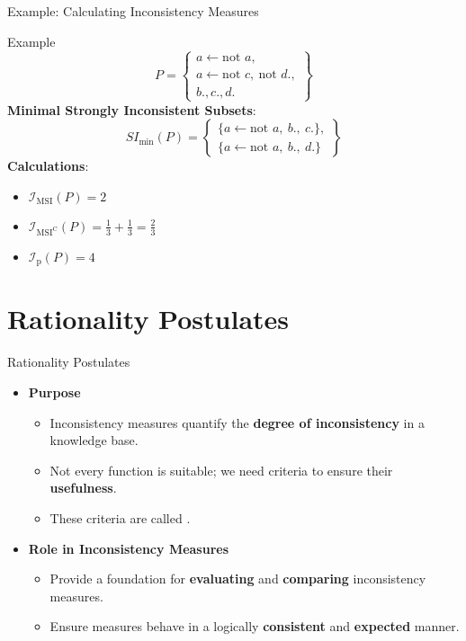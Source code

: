 \begin{frame}{Example: Calculating Inconsistency Measures}
    \begin{exampleblock}{Example}
        \[
            P = \left\{ \begin{array}{l}
                a \leftarrow \text{not } a,                  \\
                a \leftarrow \text{not } c,\ \text{not } d., \\
                b., c., d.
            \end{array} \right\}
        \]
        \textbf{Minimal Strongly Inconsistent Subsets}:
        \[
            SI_{\min}(P) = \left\{ \begin{array}{l}
                \{ a \leftarrow \text{not } a,\ b.,\ c. \}, \\
                \{ a \leftarrow \text{not } a,\ b.,\ d. \}
            \end{array} \right\}
        \]
        \textbf{Calculations}:
        \begin{itemize}
            \item \( \mathcal{I}_{\text{MSI}}(P) = 2 \)
            \item \( \mathcal{I}_{\text{MSI}^\text{C}}(P) = \frac{1}{3} + \frac{1}{3} = \frac{2}{3} \)
            \item \( \mathcal{I}_{\text{p}}(P) = 4 \)
        \end{itemize}
    \end{exampleblock}
\end{frame}

\section{Rationality Postulates}

\begin{frame}{Rationality Postulates}
    \begin{itemize}
        \item \textbf{Purpose}
              \begin{itemize}
                  \item Inconsistency measures quantify the \textbf{degree of inconsistency} in a knowledge base.
                  \item Not every function is suitable; we need criteria to ensure their \textbf{usefulness}.
                  \item These criteria are called .
              \end{itemize}
        \item \textbf{Role in Inconsistency Measures}
              \begin{itemize}
                  \item Provide a foundation for \textbf{evaluating} and \textbf{comparing} inconsistency measures.
                  \item Ensure measures behave in a logically \textbf{consistent} and \textbf{expected} manner.
              \end{itemize}
    \end{itemize}
\end{frame}


